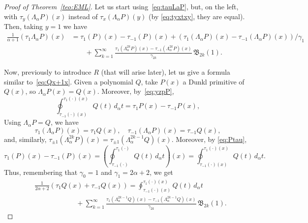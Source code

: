 \documentclass[10pt]{article}
\theoremstyle{plain}
\theoremstyle{definition}
\numberwithin{equation}{section} %
\newcommand{\La}{\Lambda_{\alpha}}
\newcommand{\B}{\mathfrak{B}}
\newcommand{\cc}{\gamma}
\begin{document}
\begin{proof}[Proof of Theorem~\ref{teo:EML}]
Let us start using~\eqref{eq:tauLaP}, but, on the left, with $\tau_y(\La P)(x)$ instead of $\tau_x(\La P)(y)$ (by \eqref{eq:tyxtxy}, they are equal). Then, taking $y=1$ we have 
\begin{align*}
  \frac{1}{\alpha+1} (\tau_1 \La P)(x) &= \tau_1(P)(x) - \tau_{-1} (P)(x)
  + (\tau_1(\La P)(x) - \tau_{-1} (\La P)(x))/\cc_1 \\
  &\qquad + \sum_{k=1}^{\infty} \frac{\tau_1(\La^{2k} P)(x) - \tau_{-1} (\La^{2k} P)(x)}{\cc_{2k}} \, \B_{2k}(1).
\end{align*}

Now, previously to introduce $R$ (that will arise later), let us give a formula similar to~\eqref{eq:Qx+1x}.
Given a polynomial $Q$, take $P(x)$ a Dunkl primitive of $Q(x)$, so $\La P(x) = Q(x)$. Moreover, by~\eqref{eq:yzpP},
\begin{equation}
\label{eq:Ptau}
  \oint_{\tau_{-1}(\cdot)(x)}^{\tau_1(\cdot)(x)} Q(t)\,d_\alpha t = \tau_1 P(x) - \tau_{-1}P(x),
\end{equation}
Using $\La P = Q$, we have 
\[
  \tau_1(\La P)(x) = \tau_1 Q(x), \quad \tau_{-1} (\La P)(x) = \tau_{-1} Q(x),
\]
and, similarly, $\tau_{\pm1} (\La^{2k} P)(x) = \tau_{\pm1} (\La^{2k-1} Q)(x)$.
Moreover, by \eqref{eq:Ptau},
\[
  \tau_1(P)(x) - \tau_{-1} (P)(x)
  = \left( \oint_{\tau_{-1}(\cdot)}^{\tau_1(\cdot)} Q(t)\,d_\alpha t \right)(x) 
  = \oint_{\tau_{-1}(\cdot)(x)}^{\tau_1(\cdot)(x)} Q(t)\,d_\alpha t .
\]
Thus, remembering that $\cc_0=1$ and $\cc_1=2\alpha+2$, we get
\begin{equation}
\label{eq:t1t-1Q}
\begin{aligned}
  &\frac{1}{2\alpha+2} (\tau_1 Q(x)+ \tau_{-1}Q(x)) 
  = \oint_{\tau_{-1}(\cdot)(x)}^{\tau_1(\cdot)(x)} Q(t)\,d_\alpha t \\
  &\qquad\qquad\qquad + \sum_{k=1}^{\infty} \frac{\tau_1(\La^{2k-1} Q)(x) 
    - \tau_{-1} (\La^{2k-1} Q)(x)}{\cc_{2k}} \, \B_{2k}(1).
\end{aligned}
\end{equation}


\end{proof}
\end{document}
